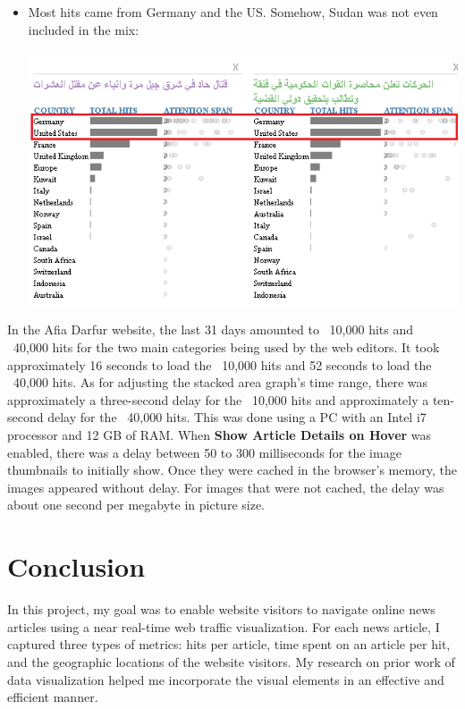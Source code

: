 \documentclass[12pt]{article}
\begin{document}
{\begin{itemize}
\item Most hits came from Germany and the US. Somehow, Sudan was not even included in the mix: \\ \\
\noindent\includegraphics[scale=0.7]{img/obz3}
 
\end{itemize}

\newpage

In the Afia Darfur website, the last 31 days amounted to ~10,000 hits and ~40,000 hits for the two main categories being used by the web editors. It took approximately 16 seconds to load the ~10,000 hits and 52 seconds to load the ~40,000 hits. As for adjusting the stacked area graph's time range, there was approximately a three-second delay for the ~10,000 hits and approximately a ten-second delay for the ~40,000 hits. This was done using a PC with an Intel i7 processor and 12 GB of RAM. When \textbf{Show Article Details on Hover} was enabled, there was a delay between 50 to 300 milliseconds for the image thumbnails to initially show. Once they were cached in the browser's memory, the images appeared without delay. For images that were not cached, the delay was about one second per megabyte in picture size.


\newpage

\section{Conclusion}
In this project, my goal was to enable website visitors to navigate online news articles using a near real-time web traffic visualization. For each news article, I captured three types of metrics: hits per article, time spent on an article per hit, and the geographic locations of the website visitors. My research on prior work of data visualization helped me incorporate the visual elements in an effective and efficient manner. \\ 

}
\end{document}
